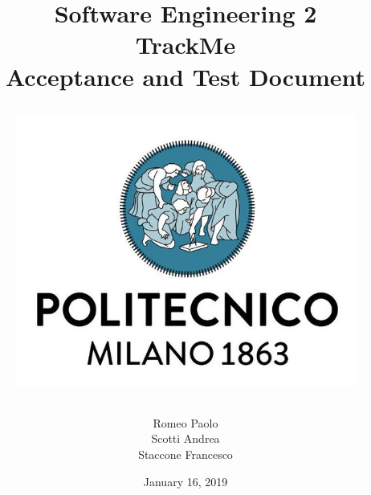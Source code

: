 \documentclass[12pt, a4paper]{article}
\begin{document}

\title{Software Engineering 2\\ \vspace{1em}  {\textbf{TrackMe}} \\ \vspace{1em} \textbf{A}cceptance and \textbf{T}est \textbf{D}ocument
	\vspace{1.5em}
\begin{figure}[H]
	\centering
	\includegraphics[scale=0.4]{Logo-PoliMi}
\end{figure}
}
\author{Romeo Paolo \\ Scotti Andrea \\ Staccone Francesco}

\date{January 16, 2019}

\maketitle

\newpage
\tableofcontents

\newpage

\newpage

\newpage

\newpage

\newpage


\newpage
\appendix
\end{document}
